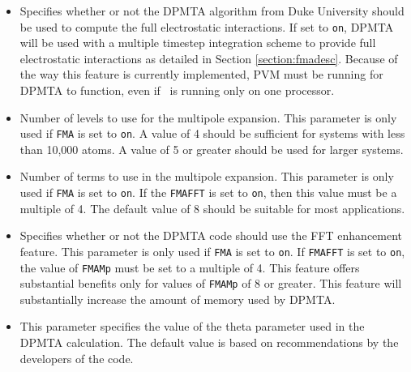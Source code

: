 \begin{itemize}

\item
{}
{Specifies whether or not 
the DPMTA algorithm from Duke University should be used 
to compute the full electrostatic interactions.  If set to 
\verb!on!, DPMTA will be used with a multiple timestep integration scheme 
to provide full electrostatic interactions as detailed in Section 
\ref{section:fmadesc}.  Because of the way this feature is currently 
implemented, PVM must be running for DPMTA to function, even if \NAMD\ 
is running only on one processor.}

\item
{}
{Number of levels to use for the multipole expansion.  This parameter
is only used if \verb!FMA! is set to \verb!on!.  
A value of 4 should be sufficient for systems with less than 10,000 atoms.  
A value of 5 or greater should be used for larger systems. }

\item
{}
{Number of terms to use in the multipole expansion.  
This parameter is only used if \verb!FMA! is set to \verb!on!.  
If the \verb!FMAFFT! is set to \verb!on!, then this value must 
be a multiple of 4.  The default value of 8 should be suitable
for most applications.}

\item
{}
{Specifies whether or not the DPMTA code should use the FFT enhancement 
feature.  This parameter is only used if \verb!FMA! is set to \verb!on!.  
If \verb!FMAFFT! is set to \verb!on!, the value of \verb!FMAMp! must be 
set to a multiple of 4.  
This feature offers substantial benefits only for values 
of \verb!FMAMp! of 8 or greater.  This feature will substantially 
increase the amount of memory used by DPMTA.}


\item
{}
{This parameter specifies the value of the theta parameter
used in the DPMTA calculation.  The default value is based on
recommendations by the developers of the code.}


\end{itemize}
